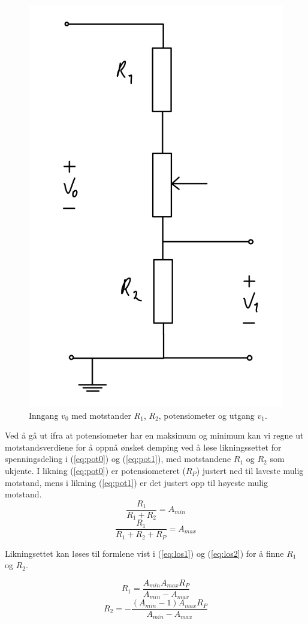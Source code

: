 \documentclass[a4paper,11pt,norsk]{article}
\begin{document}
\begin{figure}[htbp]
  \centering
  \includegraphics[height=0.4\textwidth]{D1/Images/kretsskjema.jpg} 
  \caption{Inngang $v_0$ med motstander $R_1$, $R_2$, potensiometer og utgang $v_1$.}
  \label{fig:kretsskjema}
\end{figure}
Ved å gå ut ifra at potensiometer har en maksimum og minimum kan vi regne ut motstandsverdiene for å oppnå ønsket demping ved å løse likningssettet for spenningsdeling i (\ref{eq:pot0}) og (\ref{eq:pot1}), med motstandene $R_1$ og $R_2$ som ukjente. I likning (\ref{eq:pot0}) er potensiometeret ($R_P$) justert ned til laveste mulig motstand, mens i likning (\ref{eq:pot1}) er det justert opp til høyeste mulig motstand. 
\begingroup
\Large
\begin{equation}
    \frac{R_1}{R_1+R_2} = A_{min} 
    \label{eq:pot0}
\end{equation}
\begin{equation}
    \frac{R_1}{R_1+R_2+R_P} = A_{max} 
    \label{eq:pot1}
\end{equation}
\endgroup

Likningsettet kan løses til formlene vist i (\ref{eq:los1}) og (\ref{eq:los2}) for å finne $R_1$ og $R_2$.

\begingroup
\Large
\begin{equation}
    R_1 = \frac{A_{min}A_{max}R_P}{A_{min}-A_{max}}
    \label{eq:los1}
\end{equation}
\begin{equation}
    R_2 = -\frac{(A_{min}-1)A_{max}R_P}{A_{min}-A_{max}}
    \label{eq:los2}
\end{equation}
\endgroup

\end{document}

